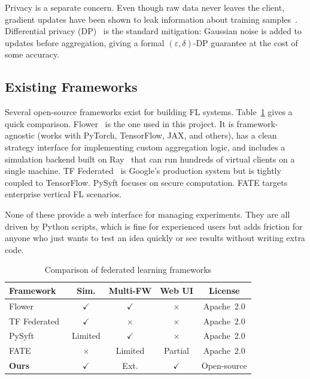 \documentclass[conference]{IEEEtran}
\begin{document}
Privacy is a separate concern.
Even though raw data never leaves the client, gradient updates have
been shown to leak information about training
samples~\cite{kairouz2021advances}.
Differential privacy (DP)~\cite{abadi2016deep} is the standard mitigation:
Gaussian noise is added to updates before aggregation, giving a formal
$(\varepsilon, \delta)$-DP guarantee at the cost of some accuracy.

\subsection{Existing Frameworks}

Several open-source frameworks exist for building FL systems.
Table~\ref{tab:frameworks} gives a quick comparison.
Flower~\cite{beutel2020flower} is the one used in this project.
It is framework-agnostic (works with PyTorch, TensorFlow, JAX, and others),
has a clean strategy interface for implementing custom aggregation logic,
and includes a simulation backend built on Ray~\cite{moritz2018ray} that
can run hundreds of virtual clients on a single machine.
TF Federated~\cite{tensorflow_federated} is Google's production system
but is tightly coupled to TensorFlow.
PySyft focuses on secure computation.
FATE targets enterprise vertical FL scenarios.

None of these provide a web interface for managing experiments.
They are all driven by Python scripts, which is fine for experienced
users but adds friction for anyone who just wants to test an idea quickly
or see results without writing extra code.

\begin{table}[t]
  \centering
  \caption{Comparison of federated learning frameworks}
  \label{tab:frameworks}
  \renewcommand{\arraystretch}{1.25}
  \begin{tabular}{@{}lcccc@{}}
    \toprule
    \textbf{Framework} & \textbf{Sim.} & \textbf{Multi-FW} &
    \textbf{Web UI} & \textbf{License} \\
    \midrule
    Flower~\cite{beutel2020flower}    & $\checkmark$ & $\checkmark$ &
      $\times$         & Apache~2.0 \\
    TF Federated~\cite{tensorflow_federated} & $\checkmark$ & $\times$ &
      $\times$         & Apache~2.0 \\
    PySyft                            & Limited      & $\checkmark$ &
      $\times$         & Apache~2.0 \\
    FATE                              & $\times$     & Limited      &
      Partial          & Apache~2.0 \\
    \midrule
    \textbf{Ours}                     & $\checkmark$ & Ext.         &
      $\checkmark$     & Open-source \\
    \bottomrule
  \end{tabular}
\end{table}
\end{document}
